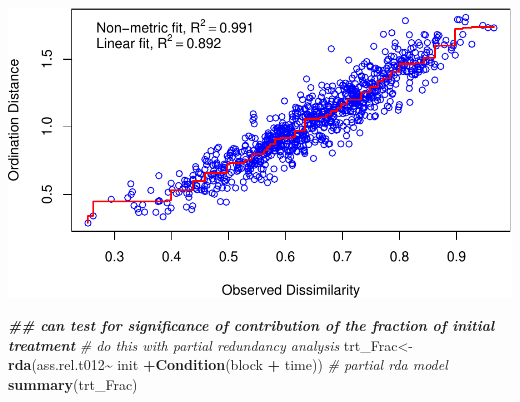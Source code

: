 \documentclass[
]{article}
\newenvironment{Shaded}{\begin{snugshade}}{\end{snugshade}}
\newcommand{\CommentTok}[1]{\textcolor[rgb]{0.56,0.35,0.01}{\textit{#1}}}
\newcommand{\DocumentationTok}[1]{\textcolor[rgb]{0.56,0.35,0.01}{\textbf{\textit{#1}}}}
\newcommand{\FunctionTok}[1]{\textcolor[rgb]{0.13,0.29,0.53}{\textbf{#1}}}
\newcommand{\NormalTok}[1]{#1}
\newcommand{\OtherTok}[1]{\textcolor[rgb]{0.56,0.35,0.01}{#1}}
\newcommand{\SpecialCharTok}[1]{\textcolor[rgb]{0.81,0.36,0.00}{\textbf{#1}}}
\begin{document}
\includegraphics{log-project-aubrie-winnie_files/figure-latex/unnamed-chunk-7-1.pdf}

\begin{Shaded}
\begin{Highlighting}[]
\DocumentationTok{\#\# can test for significance of contribution of the fraction of initial treatment}
\CommentTok{\# do this with partial redundancy analysis}
\NormalTok{trt\_Frac}\OtherTok{\textless{}{-}}\FunctionTok{rda}\NormalTok{(ass.rel.t012}\SpecialCharTok{\textasciitilde{}}\NormalTok{ init }\SpecialCharTok{+}\FunctionTok{Condition}\NormalTok{(block }\SpecialCharTok{+}\NormalTok{ time)) }\CommentTok{\# partial rda model}
\FunctionTok{summary}\NormalTok{(trt\_Frac) }
\end{Highlighting}
\end{Shaded}
\end{document}
